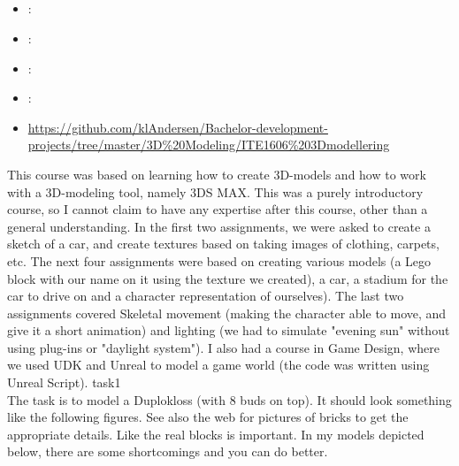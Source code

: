 \subsection[3D Modelling]{}
\label{sec:ite1606_3d_modelling}
\begin{itemize} 
	\item {}: 
	\item {}: 
	\item {}: 
	\item {}: 
	\item {} \url{https://github.com/klAndersen/Bachelor-development-projects/tree/master/3D%20Modeling/ITE1606%203Dmodellering}
\end{itemize} 
This course was based on learning how to create 3D-models and how to work with a 3D-modeling tool, namely 3DS MAX. 
This was a purely introductory course, so I cannot claim to have any expertise after this course, other than a general understanding.
\vspace{0.5em}\newline
In the first two assignments, we were asked to create a sketch of a car, and create textures based on taking images of clothing, carpets, etc. 
The next four assignments were based on creating various models (a Lego block with our name on it using the texture we created), a car, 
a stadium for the car to drive on and a character representation of ourselves).
\vspace{0.5em}\newline
The last two assignments covered Skeletal movement (making the character able to move, and give it a short animation) and lighting 
(we had to simulate "evening sun" without using plug-ins or "daylight system").
\vspace{0.5em}\newline
I also had a course in Game Design, where we used UDK and Unreal to model a game world (the code was written using Unreal Script).
\vspace{0.5em}\newline
task1 \\
The task is to model a Duplokloss (with 8 buds on top). 
It should look something like the following figures. 
See also the web for pictures of bricks to get the appropriate details. 
Like the real blocks is important. In my models depicted below, there are some shortcomings and you can do better. 
